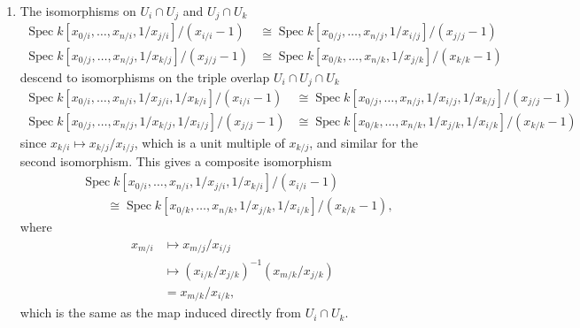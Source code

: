 \documentclass{report}
\DeclareMathOperator{\Spec}{Spec}
\begin{document}
\begin{enumerate}[label=\textbf{4.4.\Alph*.}]
	\item The isomorphisms on $U_i\cap U_j$ and $U_j\cap U_k$
	      \begin{align*}
		      \Spec k[x_{0/i},\ldots,x_{n/i},1/x_{j/i}]/(x_{i/i}-1)
		       & \cong \Spec k[x_{0/j},\ldots,x_{n/j},1/x_{i/j}]/(x_{j/j}-1) \\
		      \Spec k[x_{0/j},\ldots,x_{n/j},1/x_{k/j}]/(x_{j/j}-1)
		       & \cong \Spec k[x_{0/k},\ldots,x_{n/k},1/x_{j/k}]/(x_{k/k}-1)
	      \end{align*}
	      descend to isomorphisms on the triple overlap $U_i\cap U_j\cap U_k$
	      \begin{align*}
		      \Spec k[x_{0/i},\ldots,x_{n/i},1/x_{j/i},1/x_{k/i}]/(x_{i/i}-1)
		       & \cong \Spec k[x_{0/j},\ldots,x_{n/j},1/x_{i/j},1/x_{k/j}]/(x_{j/j}-1) \\
		      \Spec k[x_{0/j},\ldots,x_{n/j},1/x_{k/j},1/x_{i/j}]/(x_{j/j}-1)
		       & \cong \Spec k[x_{0/k},\ldots,x_{n/k},1/x_{j/k},1/x_{i/k}]/(x_{k/k}-1)
	      \end{align*}
	      since $x_{k/i}\mapsto x_{k/j}/x_{i/j}$, which is a unit multiple of
	      $x_{k/j}$, and similar for the second isomorphism. This gives a
	      composite isomorphism
	      \begin{align*}
		       & \Spec k[x_{0/i},\ldots,x_{n/i},1/x_{j/i},1/x_{k/i}]/(x_{i/i}-1)              \\
		       & \qquad\cong \Spec k[x_{0/k},\ldots,x_{n/k},1/x_{j/k},1/x_{i/k}]/(x_{k/k}-1),
	      \end{align*}
	      where
	      \begin{align*}
		      x_{m/i} & \mapsto x_{m/j}/x_{i/j}                         \\
		              & \mapsto (x_{i/k}/x_{j/k})^{-1}(x_{m/k}/x_{j/k}) \\
		              & = x_{m/k}/x_{i/k},
	      \end{align*}
	      which is the same as the map induced directly from $U_i\cap U_k$.


\end{enumerate}
\end{document}
